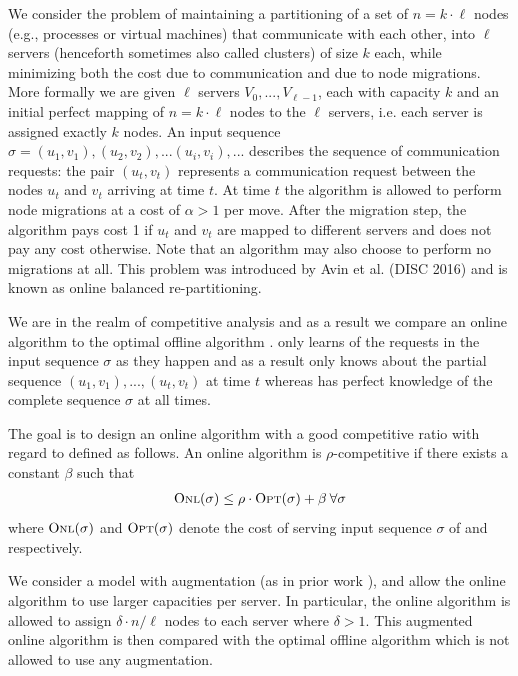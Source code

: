 \documentclass[a4paper,UKenglish,cleveref, autoref, thm-restate,authorcolumns]{lipics-v2019}
\newcommand{\opt}{\text{O{\scriptsize PT}}}
\newcommand{\onl}{\text{O{\scriptsize NL}}}
\begin{document}
We consider the problem of maintaining a partitioning of a 
set of $n=k\cdot \ell$ nodes (e.g., processes or virtual machines) 
that communicate with each other, 
into $\ell$ servers (henceforth sometimes also called clusters) of size $k$ each, 
while minimizing both the cost due to communication and due to node migrations. 
More formally we are given $\ell$ servers $V_0,...,V_{\ell-1}$, 
each with capacity $k$ and an initial perfect mapping of $n=k\cdot \ell$ nodes to the $\ell$ servers, 
i.e. each server is assigned exactly $k$ nodes. An input sequence $\sigma=(u_1, v_1), (u_2, v_2),...(u_i,v_i),...$ describes 
the sequence of communication requests: the pair $(u_t, v_t)$ represents a communication request between the nodes 
$u_t$ and $v_t$ arriving at time $t$. At time $t$ the algorithm is allowed to perform node migrations at a cost of $\alpha>1$ per move. 
After the migration step, the algorithm pays cost 1 if $u_t$ and $v_t$ are mapped to different servers and does not pay any cost otherwise. Note that an algorithm may also choose to perform no migrations at all.
This problem was introduced by Avin et al. \cite{Avin2016} (DISC 2016)
and is known as online balanced re-partitioning.

We are in the realm of competitive analysis and as a result we compare an online algorithm \onl{} to the optimal offline algorithm \opt{}. \onl{} only learns of the requests in the input sequence $\sigma$ as they happen and as a result only knows about the partial sequence $(u_1,v_1),...,(u_t,v_t)$ at time $t$ whereas \opt{} has perfect knowledge of the complete sequence $\sigma$ at all times.

The goal is to design an online algorithm \onl{} with a good competitive ratio with regard to \opt{} defined as follows.
An online algorithm \onl{} is $\rho$-competitive if there exists a constant $\beta$ such that 
\begin{align*}
\onl{}(\sigma)\leq\rho\cdot \opt{}(\sigma)+\beta\:\forall \sigma
\end{align*} 
where $\onl{}(\sigma)$ and $\opt{}(\sigma)$ denote the cost of serving input sequence $\sigma$ of \onl{} and \opt{} respectively.

We consider a model with augmentation (as in prior work \cite{Avin2016}),
and allow the online algorithm to use larger capacities per server. 
In particular, the online algorithm is allowed to assign $\delta\cdot n/\ell$ nodes to each server where $\delta>1$. 
This augmented online algorithm is then compared with the optimal offline algorithm \opt{} which is not allowed to use any augmentation.
\end{document}
